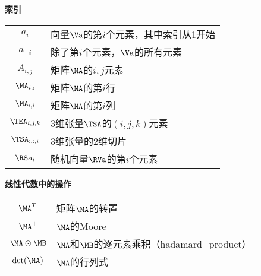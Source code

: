 \vspace{\notationgap}
\begin{minipage}{\textwidth}
\centerline{\bf 索引}
\bgroup
\def\arraystretch{1.5}
\begin{tabular}{cp{3.25in}}
$\displaystyle a_i$ & 向量$\Va$的第$i$个元素，其中索引从1开始  \\
$\displaystyle a_{-i}$ & 除了第$i$个元素，$\Va$的所有元素 \\
$\displaystyle A_{i,j}$ & 矩阵$\MA$的$i,j$元素 \\
$\displaystyle \MA_{i, :}$ & 矩阵$\MA$的第$i$行 \\
$\displaystyle \MA_{:, i}$ & 矩阵$\MA$的第$i$列 \\
$\displaystyle \TEA_{i, j, k}$ & 3维张量$\TSA$的$(i, j, k)$元素   \\
$\displaystyle \TSA_{:, :, i}$ & 3维张量的2维切片 \\
$\displaystyle \RSa_i$ & 随机向量$\RVa$的第$i$个元素 \\
\end{tabular} 
\egroup
\end{minipage}

\vspace{\notationgap}
\begin{minipage}{\textwidth}
\centerline{\bf 线性代数中的操作}
\bgroup
\def\arraystretch{1.5}
\begin{tabular}{cp{3.25in}}
$\displaystyle \MA^T$ & 矩阵$\MA$的转置 \\
$\displaystyle \MA^+$ & $\MA$的\gls{Moore} \\
$\displaystyle \MA \odot \MB $ &  $\MA$和$\MB$的逐元素乘积（\gls{hadamard_product}） \\
$\displaystyle \mathrm{det}(\MA)$ & $\MA$的行列式 \\
\end{tabular} 
\egroup
\end{minipage}

